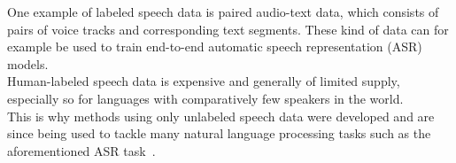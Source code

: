 One example of labeled speech data is paired audio-text data, which consists of pairs of voice tracks and corresponding text segments. These kind of data can for example be used to train end-to-end automatic speech representation (ASR) models.\\Human-labeled speech data is expensive and generally of limited supply, especially so for languages with comparatively few speakers in the world.\\This is why methods using only unlabeled speech data were developed and are since being used to tackle many natural language processing tasks such as the aforementioned ASR task~\cite{unsupervised_learning}.